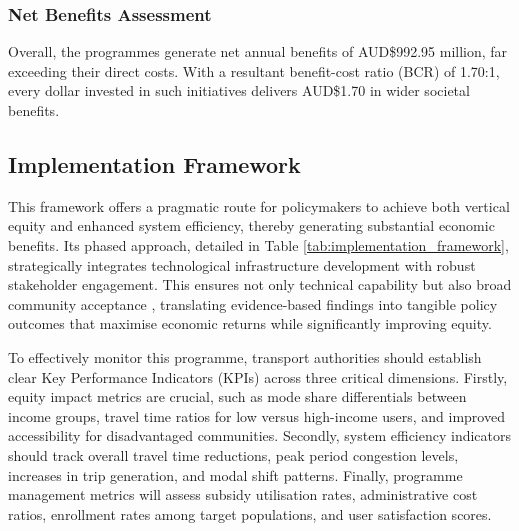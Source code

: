 \documentclass[a4paper,fleqn]{cas-sc}
\begin{document}
\subsubsection{Net Benefits Assessment}

Overall, the programmes generate net annual benefits of AUD\$992.95 million, far exceeding their direct costs. With a resultant benefit-cost ratio (BCR) of 1.70:1, every dollar invested in such initiatives delivers AUD\$1.70 in wider societal benefits.


\subsection{Implementation Framework}

This framework offers a pragmatic route for policymakers to achieve both vertical equity and enhanced system efficiency, thereby generating substantial economic benefits. Its phased approach, detailed in Table \ref{tab:implementation_framework}, strategically integrates technological infrastructure development with robust stakeholder engagement. This ensures not only technical capability but also broad community acceptance \cite{Quay2010}, translating evidence-based findings into tangible policy outcomes that maximise economic returns while significantly improving equity.

To effectively monitor this programme, transport authorities should establish clear Key Performance Indicators (KPIs) across three critical dimensions. Firstly, equity impact metrics are crucial, such as mode share differentials between income groups, travel time ratios for low versus high-income users, and improved accessibility for disadvantaged communities. Secondly, system efficiency indicators should track overall travel time reductions, peak period congestion levels, increases in trip generation, and modal shift patterns. Finally, programme management metrics will assess subsidy utilisation rates, administrative cost ratios, enrollment rates among target populations, and user satisfaction scores.
\end{document}
